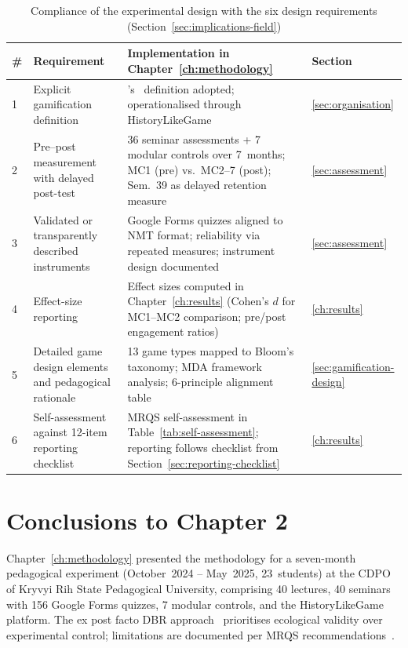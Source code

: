 \begin{table}[!h]
\centering
\caption{Compliance of the experimental design with the six design requirements (Section~\ref{sec:implications-field})}
\label{tab:design-req-compliance}
\small
\begin{tabular}{@{}p{0.4cm}p{4.2cm}p{4.5cm}p{3cm}@{}}
\toprule
\textbf{\#} & \textbf{Requirement} & \textbf{Implementation in Chapter~\ref{ch:methodology}} & \textbf{Section} \\
\midrule
1 & Explicit gamification definition & \citeauthor{Deterding2011}'s~\cite{Deterding2011} definition adopted; operationalised through HistoryLikeGame & \ref{sec:organisation} \\
\midrule
2 & Pre--post measurement with delayed post-test & 36 seminar assessments + 7 modular controls over 7~months; MC1 (pre) vs.\ MC2--7 (post); Sem.~39 as delayed retention measure & \ref{sec:assessment} \\
\midrule
3 & Validated or transparently described instruments & Google Forms quizzes aligned to NMT format; reliability via repeated measures; instrument design documented & \ref{sec:assessment} \\
\midrule
4 & Effect-size reporting & Effect sizes computed in Chapter~\ref{ch:results} (Cohen's $d$ for MC1--MC2 comparison; pre/post engagement ratios) & \ref{ch:results} \\
\midrule
5 & Detailed game design elements and pedagogical rationale & 13 game types mapped to Bloom's taxonomy; MDA framework analysis; 6-principle alignment table & \ref{sec:gamification-design} \\
\midrule
6 & Self-assessment against 12-item reporting checklist & MRQS self-assessment in Table~\ref{tab:self-assessment}; reporting follows checklist from Section~\ref{sec:reporting-checklist} & \ref{ch:results} \\
\bottomrule
\end{tabular}
\end{table}


\section{Conclusions to Chapter 2} \label{sec:ch2-conclusions}

Chapter~\ref{ch:methodology} presented the methodology for a seven-month pedagogical experiment (October~2024 -- May~2025, 23~students) at the CDPO of Kryvyi Rih State Pedagogical University, comprising 40 lectures, 40 seminars with 156 Google Forms quizzes, 7 modular controls, and the HistoryLikeGame platform. The ex post facto DBR approach~\cite{Bakker2018, AndersonShattuck2012} prioritises ecological validity over experimental control; limitations are documented per MRQS recommendations~\cite{Page2021, Campbell2020}.

